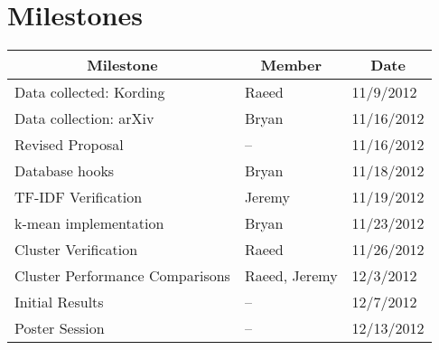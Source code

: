 \documentclass{acm_proc_article-sp}
\begin{document}
\section{Milestones}

\begin{tabular}{|l|l|l|}
	\hline
	\multicolumn{1}{|c}{Milestone} & \multicolumn{1}{|c}{Member} & \multicolumn{1}{|c|}{Date}\\
	\hline \hline
	Data collected: Kording & Raeed & 11/9/2012 \\
	\hline
	Data collection: arXiv & Bryan & 11/16/2012 \\
	\hline
	Revised Proposal & -- & 11/16/2012 \\
	\hline
	Database hooks & Bryan & 11/18/2012\\
	\hline
	TF-IDF Verification & Jeremy & 11/19/2012\\
	\hline
	k-mean implementation & Bryan & 11/23/2012\\
	\hline
	Cluster Verification & Raeed & 11/26/2012\\
	\hline
	Cluster Performance Comparisons & Raeed, Jeremy & 12/3/2012\\
	\hline
	Initial Results & -- & 12/7/2012\\
	\hline
	Poster Session & -- & 12/13/2012\\
	\hline
\end{tabular}
%

\nocite{*}
\end{document}
